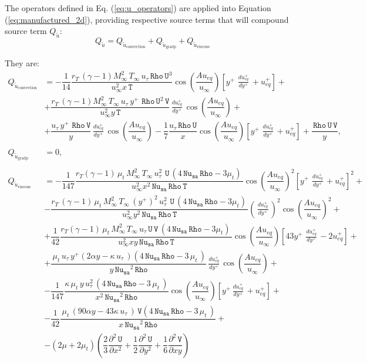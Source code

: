 \documentclass[10pt]{article}
\newcommand{\diff}[2] {\dfrac{\partial #1}{\partial #2}}
\newcommand{\Rho}{\,\mathtt{Rho}}
\newcommand{\U}{\,\mathtt{U}}
\newcommand{\V}{\,\mathtt{V}}
\newcommand{\Nu}{\,\mathtt{Nu_{sa}}}
\newcommand{\T}{\,\mathtt{T}}
\newcommand{\Dueqplusyplus}{\, \frac{du_{eq}^+}{dy^+}\,}
\newcommand{\tu}{\tilde{u}}
\begin{document}
The operators defined in Eq. (\ref{eq:u_operators}) are applied into Equation (\ref{eq:manufactured_2d}), providing respective source terms that will compound source term $Q_{\tu}$:
\begin{equation*}
Q_{\tu}	=Q_{\tu_\text{convection}} + Q_{\tu_\text{gradp}}+Q_{\tu_\text{viscous}}
\end{equation*}

They are:
\begin{equation}
 \begin{split}
Q_{\tu_\text{convection}}&= -\dfrac{1}{14} \dfrac{r_T \, (\gamma-1)  M_{\infty}^2 \, T_{\infty} \,  u_{\tau} \Rho \U^3}{u_{\infty}^2 x \T} \cos\left(\dfrac{A u_{eq}}{u_{\infty}}\right)\left[y^{+} \, \Dueqplusyplus+u_{eq}^{+} \right]+\\
%
&+\dfrac{r_T \, (\gamma-1) M_{\infty}^2 \, T_{\infty} \,   u_{\tau} \,  y^{+} \,\Rho \U^2 \V}{u_{\infty}^2 y \T} \Dueqplusyplus  \cos\left(\dfrac{A u_{eq}}{u_{\infty}}\right)+\\
%
&+\dfrac{ u_{\tau} \,  y^{+} \, \Rho \V }{y} \Dueqplusyplus \cos\left(\dfrac{A u_{eq}}{u_{\infty}}\right)-\dfrac{1}{7} \dfrac{u_{\tau} \Rho \U}{x}\cos\left(\dfrac{A u_{eq}}{u_{\infty}}\right)\left[y^{+} \, \Dueqplusyplus+u_{eq}^{+} \right]  +\dfrac{\Rho \U \V}{y} ,\\ 
&\\
Q_{\tu_\text{gradp}} &= 0 , \\
%
&\\
Q_{\tu_\text{viscous}} &=-\dfrac{1}{147} \dfrac{r_T(\gamma-1) \,  \mu_t  \, M_{\infty}^2 \, T_{\infty} \,  u_{\tau}^2 \, \U \, (4 \Nu \Rho-3 \mu_t) \, }{u_{\infty}^2 x^2 \Nu \Rho \T} \cos\left(\dfrac{A u_{eq}}{u_{\infty}}\right)^2 \left[y^{+} \, \Dueqplusyplus+u_{eq}^{+} \right]^2+\\
%
&-\dfrac{r_T \, (\gamma-1) \,  \mu_t \, M_{\infty}^2 \, T_{\infty} \,  (y^{+})^2 \,  u_{\tau}^2 \, \U \, (4 \Nu \Rho-3 \mu_t) \,}{u_{\infty}^2 y^2 \Nu \Rho \T} \left(\Dueqplusyplus\right)^2  \cos\left(\dfrac{A u_{eq}}{u_{\infty}}\right)^2+\\
%
&+\dfrac{1}{42} \dfrac{  r_T(\gamma-1) \,  \mu_t  \, M_{\infty}^2 \, T_{\infty} \,  u_{\tau} \U \V \, (4 \Nu \Rho-3 \mu_t) \,}{u_{\infty}^2 x y \Nu \Rho \T} \cos\left(\dfrac{A u_{eq}}{u_{\infty}}\right)\left[43 y^{+} \, \Dueqplusyplus-2 u_{eq}^{+}\right]+\\
&+ \dfrac{\, \mu_t \, u_{\tau} \, y^{+}(2 \alpha y-\kappa \, u_{\tau} \, ) (4 \Nu \Rho-3 \, \mu_t \, )}{y \Nu^2 \Rho} \Dueqplusyplus \cos\left(\dfrac{A u_{eq}}{u_{\infty}} \right)+\\
&-\dfrac{1}{147}\dfrac{ \kappa \, \mu_t \, y \, u_{\tau}^2 \, (4 \Nu \Rho-3 \, \mu_t \, ) }{x^2 \Nu^2 \Rho} \cos\left(\dfrac{A u_{eq}}{u_{\infty}} \right)\left[y^{+} \Dueqplusyplus+u_{eq}^{+}\right]+\\
&-\dfrac{1}{42} \dfrac{\, \mu_t \, (90 \alpha y-43 \kappa \, u_{\tau} \, ) \V(4 \Nu \Rho-3 \, \mu_t \, ) }{x \Nu^2 \Rho}+\\
%
&-(2 \mu + 2 \mu_t) \left(\dfrac{2}{3} \diff{^2 \U}{x^2}+\dfrac{1}{2}  \diff{^2 \U}{y^2} +\dfrac{1}{6} \diff{^2 \V}{xy}\right)
 \end{split}
\end{equation}
\end{document}
